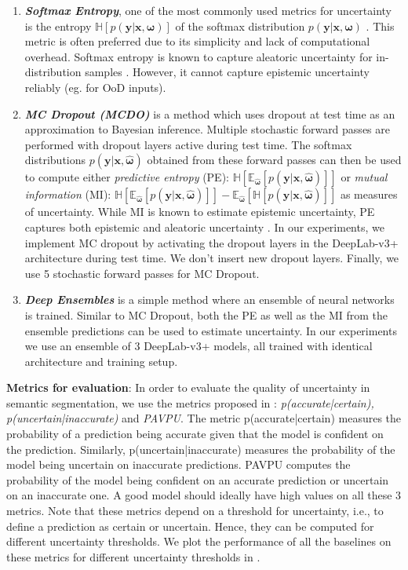 \documentclass{article}
\begin{document}
\begin{enumerate}
    \item \emph{\textbf{Softmax Entropy}}, one of the most commonly used metrics for uncertainty is the entropy $\mathbb{H}[p(\mathbf{y|x, \omega})]$ of the softmax distribution $p(\mathbf{y|x, \omega})$ \citep{hendrycks2016baseline}. This metric is often preferred due to its simplicity and lack of computational overhead. Softmax entropy is known to capture aleatoric uncertainty for in-distribution samples \citep{mukhoti2021deterministic}. However, it cannot capture epistemic uncertainty reliably (eg. for OoD inputs).
    
    \item \emph{\textbf{MC Dropout (MCDO)}} \citep{gal2016dropout} is a method which uses dropout at test time as an approximation to Bayesian inference. Multiple stochastic forward passes are performed with dropout layers active during test time. The softmax distributions $p(\mathbf{y|x, \hat{\omega}})$ obtained from these forward passes can then be used to compute either \emph{predictive entropy} (PE): $\mathbb{H}[\mathbb{E}_{\mathbf{\hat{\omega}}}[p(\mathbf{y|x, \hat{\omega}})]]$ or \emph{mutual information} (MI): $\mathbb{H}[\mathbb{E}_{\mathbf{\hat{\omega}}}[p(\mathbf{y|x, \hat{\omega}})]] - \mathbb{E}_{\mathbf{\hat{\omega}}}[\mathbb{H}[p(\mathbf{y|x, \hat{\omega}})]]$ \citep{houlsby2011bayesian} as measures of uncertainty. While MI is known to estimate epistemic uncertainty, PE captures both epistemic and aleatoric uncertainty \citep{Gal2016Uncertainty}. In our experiments, we implement MC dropout by activating the dropout layers in the DeepLab-v3+ architecture during test time. We don't insert new dropout layers. Finally, we use 5 stochastic forward passes for MC Dropout.
    
    \item \emph{\textbf{Deep Ensembles}} \citep{deep_ensembles} is a simple method where an ensemble of neural networks is trained. Similar to MC Dropout, both the PE as well as the MI from the ensemble predictions can be used to estimate uncertainty. In our experiments we use an ensemble of 3 DeepLab-v3+ models, all trained with identical architecture and training setup.
\end{enumerate}

\textbf{Metrics for evaluation}: In order to evaluate the quality of uncertainty in semantic segmentation, we use the metrics proposed in \citep{mukhoti2018evaluating}: \emph{p(accurate|certain), p(uncertain|inaccurate)} and \emph{PAVPU}. The metric p(accurate|certain) measures the probability of a prediction being accurate given that the model is confident on the prediction. Similarly, p(uncertain|inaccurate) measures the probability of the model being uncertain on inaccurate predictions. PAVPU computes the probability of the model being confident on an accurate prediction or uncertain on an inaccurate one. A good model should ideally have high values on all these 3 metrics. Note that these metrics depend on a threshold for uncertainty, i.e., to define a prediction as certain or uncertain. Hence, they can be computed for different uncertainty thresholds. We plot the performance of all the baselines on these metrics for different uncertainty thresholds in .
\end{document}

